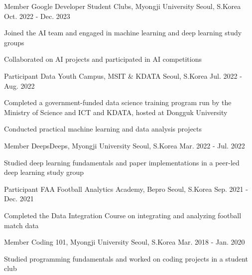 \documentclass[11pt, a4paper]{awesome-cv}
\begin{document}
\begin{cventries}
\cventry
    {Member}
    {Google Developer Student Clubs, Myongji University}
    {Seoul, S.Korea}
    {Oct. 2022 - Dec. 2023}
    {
      \begin{cvitems}
        \item {Joined the AI team and engaged in machine learning and deep learning study groups}
        \item {Collaborated on AI projects and participated in AI competitions}
      \end{cvitems}
    }
\vspace{-1mm}
\cventry
    {Participant}
    {Data Youth Campus, MSIT \& KDATA}
    {Seoul, S.Korea}
    {Jul. 2022 - Aug. 2022}
    {
      \begin{cvitems}
        \item {Completed a government-funded data science training program run by the Ministry of Science and ICT and KDATA, hosted at Dongguk University}
        \item {Conducted practical machine learning and data analysis projects}
      \end{cvitems}
    }
\vspace{-1mm}
\cventry
    {Member}
    {DeepsDeeps, Myongji University}
    {Seoul, S.Korea}
    {Mar. 2022 - Jul. 2022}
    {
      \begin{cvitems}
        \item {Studied deep learning fundamentals and paper implementations in a peer-led deep learning study group}
      \end{cvitems}
    }
\vspace{-1mm}
\cventry
    {Participant}
    {FAA Football Analytics Academy, Bepro}
    {Seoul, S.Korea}
    {Sep. 2021 - Dec. 2021}
    {
      \begin{cvitems}
        \item {Completed the Data Integration Course on integrating and analyzing football match data}
      \end{cvitems}
    }
\vspace{-1mm}
\cventry
    {Member}
    {Coding 101, Myongji University}
    {Seoul, S.Korea}
    {Mar. 2018 - Jan. 2020}
    {
      \begin{cvitems}
        \item {Studied programming fundamentals and worked on coding projects in a student club}
      \end{cvitems}
    }
\end{cventries}
\end{document}
